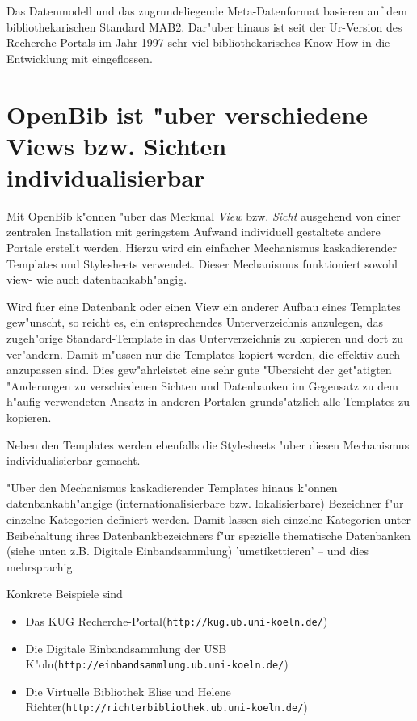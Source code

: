 \documentclass[11pt, twoside, a4paper, BCOR8mm, DIV12, bibtotoc,idxtotoc]{scrbook}
\begin{document}
Das Datenmodell und das zugrundeliegende Meta-Datenformat basieren auf
dem biblio\-the\-ka\-ri\-schen Standard MAB2. Dar"uber hinaus ist seit der
Ur-Version des Recherche-Portals im Jahr 1997 sehr viel
bibliothekarisches Know-How in die Entwicklung mit eingeflossen.


\section{OpenBib ist "uber verschiedene Views bzw. Sichten
  individualisierbar}
Mit OpenBib k"onnen "uber das Merkmal \textit{View}
bzw. \textit{Sicht} ausgehend von einer zentralen In\-stal\-la\-tion mit
geringstem Aufwand individuell gestaltete andere Portale erstellt
werden. Hierzu wird ein einfacher Mechanismus kaskadierender Templates
und Stylesheets verwendet. Dieser Mechanismus funktioniert sowohl
view- wie auch datenbankabh"angig. 

Wird fuer eine Datenbank oder einen View ein anderer Aufbau eines
Templates gew"unscht, so reicht es, ein entsprechendes
Unterverzeichnis anzulegen, das zugeh"orige Standard-Template in das
Unterverzeichnis zu kopieren und dort zu ver"andern. Damit m"ussen nur
die Templates kopiert werden, die effektiv auch anzupassen sind. Dies
gew"ahrleistet eine sehr gute "Ubersicht der get"atigten "Anderungen
zu verschiedenen Sichten und Datenbanken im Gegensatz zu dem h"aufig
verwendeten Ansatz in anderen Portalen grunds"atzlich alle Templates
zu kopieren.

Neben den Templates werden ebenfalls die Stylesheets "uber diesen
Mechanismus individualisierbar gemacht.

"Uber den Mechanismus kaskadierender Templates hinaus k"onnen
datenbankabh"angige (inter\-nationali\-sier\-bare bzw. lokalisierbare)
Bezeichner f"ur einzelne Kategorien definiert werden. Damit lassen
sich einzelne Kategorien unter Beibehaltung ihres Datenbankbezeichners
f"ur spezielle thematische Datenbanken (siehe unten z.B. Digitale
Einbandsammlung) 'umetikettieren' -- und dies mehrsprachig.

Konkrete Beispiele sind
\begin{itemize}
\item Das KUG Recherche-Portal\newline (\texttt{http://kug.ub.uni-koeln.de/})
\item Die Digitale Einbandsammlung der USB K"oln\newline (\texttt{http://einbandsammlung.ub.uni-koeln.de/})
\item Die Virtuelle Bibliothek Elise und Helene Richter\newline (\texttt{http://richterbibliothek.ub.uni-koeln.de/})
\end{itemize}
\end{document}
